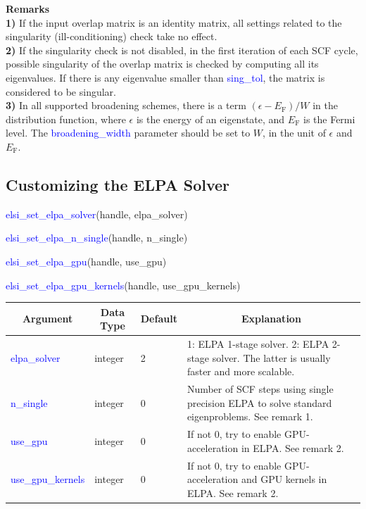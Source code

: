 \documentclass{report}
\begin{document}
\newpage
\textbf{Remarks}\\

\textbf{1)} If the input overlap matrix is an identity matrix, all settings related to the singularity (ill-conditioning) check take no effect.\\

\textbf{2)} If the singularity check is not disabled, in the first iteration of each SCF cycle, possible singularity of the overlap matrix is checked by computing all its eigenvalues.  If there is any eigenvalue smaller than \textcolor{blue}{sing\_tol}, the matrix is considered to be singular.\\

\textbf{3)} In all supported broadening schemes, there is a term $(\epsilon - E_\text{F})/W$ in the distribution function, where $\epsilon$ is the energy of an eigenstate, and $E_\text{F}$ is the Fermi level.  The \textcolor{blue}{broadening\_width} parameter should be set to $W$, in the unit of $\epsilon$ and $E_\text{F}$.\\

\subsection{Customizing the ELPA Solver}
\label{subsec:setter_elpa}
\begin{labeling}{\hspace{6cm}}
\item [\hspace{0.3cm} \textcolor{blue}{elsi\_set\_elpa\_solver}(handle, elpa\_solver)]
\item [\hspace{0.3cm} \textcolor{blue}{elsi\_set\_elpa\_n\_single}(handle, n\_single)]
\item [\hspace{0.3cm} \textcolor{blue}{elsi\_set\_elpa\_gpu}(handle, use\_gpu)]
\item [\hspace{0.3cm} \textcolor{blue}{elsi\_set\_elpa\_gpu\_kernels}(handle, use\_gpu\_kernels)]
\end{labeling}

\begin{tabular}[]{|p{30mm}|p{20mm}|p{15mm}|p{100mm}|}
\hline
\multicolumn{1}{|c|}{\textbf{Argument}} & \multicolumn{1}{c|}{\textbf{Data Type}} & \multicolumn{1}{c|}{\textbf{Default}} & \multicolumn{1}{c|}{\textbf{Explanation}}\\
\hline
\textcolor{blue}{elpa\_solver}      & integer & 2 & 1:  ELPA 1-stage solver.  2:  ELPA 2-stage solver.  The latter is usually faster and more scalable.\\
\hline
\textcolor{blue}{n\_single}         & integer & 0 & Number of SCF steps using single precision ELPA to solve standard eigenproblems.  See remark 1.\\
\hline
\textcolor{blue}{use\_gpu}          & integer & 0 & If not 0, try to enable GPU-acceleration in ELPA.  See remark 2.\\
\hline
\textcolor{blue}{use\_gpu\_kernels} & integer & 0 & If not 0, try to enable GPU-acceleration and GPU kernels in ELPA.  See remark 2.\\
\hline
\end{tabular}
\end{document}

